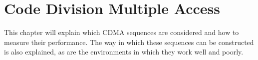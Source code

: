 
\chapter{Code Division Multiple Access}
\label{chp:cdma}


This chapter will explain which CDMA sequences are considered and how to measure their performance.
The way in which these sequences can be constructed is also explained, as are the environments in which they work well and poorly. 







